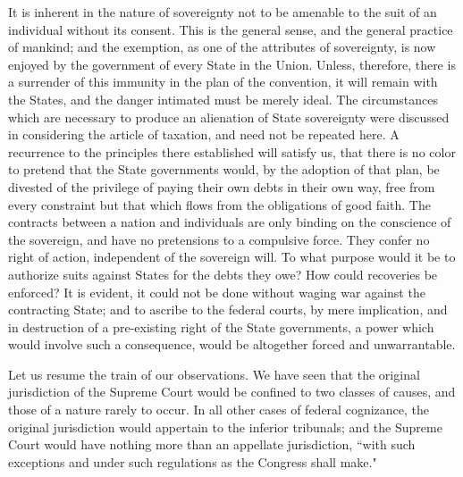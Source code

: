 It is inherent in the nature of sovereignty not to be amenable to the suit of an individual without its consent. This is the general sense, and the general practice of mankind; and the exemption, as one of the attributes of sovereignty, is now enjoyed by the government of every State in the Union. Unless, therefore, there is a surrender of this immunity in the plan of the convention, it will remain with the States, and the danger intimated must be merely ideal. The circumstances which are necessary to produce an alienation of State sovereignty were discussed in considering the article of taxation, and need not be repeated here. A recurrence to the principles there established will satisfy us, that there is no color to pretend that the State governments would, by the adoption of that plan, be divested of the privilege of paying their own debts in their own way, free from every constraint but that which flows from the obligations of good faith. The contracts between a nation and individuals are only binding on the conscience of the sovereign, and have no pretensions to a compulsive force. They confer no right of action, independent of the sovereign will. To what purpose would it be to authorize suits against States for the debts they owe? How could recoveries be enforced? It is evident, it could not be done without waging war against the contracting State; and to ascribe to the federal courts, by mere implication, and in destruction of a pre-existing right of the State governments, a power which would involve such a consequence, would be altogether forced and unwarrantable.

Let us resume the train of our observations. We have seen that the original jurisdiction of the Supreme Court would be confined to two classes of causes, and those of a nature rarely to occur. In all other cases of federal cognizance, the original jurisdiction would appertain to the inferior tribunals; and the Supreme Court would have nothing more than an appellate jurisdiction, ``with such exceptions and under such regulations as the Congress shall make."

